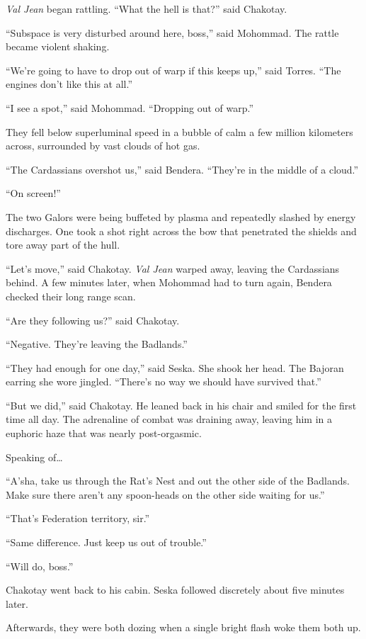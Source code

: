 \documentclass[twoside,letterpaper,12pt]{memoir}
\begin{document}
\textit{Val Jean} began rattling. ``What the hell is that?'' said Chakotay.

``Subspace is very disturbed around here, boss,'' said Mohommad. The rattle became violent shaking.

``We're going to have to drop out of warp if this keeps up,'' said Torres. ``The engines don't like this at all.''

``I see a spot,'' said Mohommad. ``Dropping out of warp.''

They fell below superluminal speed in a bubble of calm a few million kilometers across, surrounded by vast clouds of hot gas.

``The Cardassians overshot us,'' said Bendera. ``They're in the middle of a cloud.''

``On screen!''

The two Galors were being buffeted by plasma and repeatedly slashed by energy discharges. One took a shot right across the bow that penetrated the shields and tore away part of the hull.

``Let's move,'' said Chakotay. \textit{Val Jean} warped away, leaving the Cardassians behind. A few minutes later, when Mohommad had to turn again, Bendera checked their long range scan.

``Are they following us?'' said Chakotay.

``Negative. They're leaving the Badlands.''

``They had enough for one day,'' said Seska. She shook her head. The Bajoran earring she wore jingled. ``There's no way we should have survived that.''

``But we did,'' said Chakotay. He leaned back in his chair and smiled for the first time all day. The adrenaline of combat was draining away, leaving him in a euphoric haze that was nearly post-orgasmic.

Speaking of\ldots 

``A'sha, take us through the Rat's Nest and out the other side of the Badlands. Make sure there aren't any spoon-heads on the other side waiting for us.''

``That's Federation territory, sir.''

``Same difference. Just keep us out of trouble.''

``Will do, boss.''

Chakotay went back to his cabin. Seska followed discretely about five minutes later.

Afterwards, they were both dozing when a single bright flash woke them both up.
\end{document}

